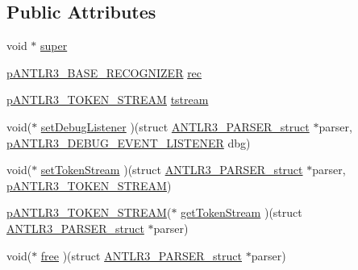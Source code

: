 \subsection*{Public Attributes}
\begin{DoxyCompactItemize}
\item 
void $\ast$ \hyperlink{struct_a_n_t_l_r3___p_a_r_s_e_r__struct_ab6f7f468e985aec5ab97d1a234f5d77b}{super}
\item 
\hyperlink{group___a_n_t_l_r3___b_a_s_e___r_e_c_o_g_n_i_z_e_r_ga5aeeb8dcbf65f45605ae07cbd618e24c}{p\-A\-N\-T\-L\-R3\-\_\-\-B\-A\-S\-E\-\_\-\-R\-E\-C\-O\-G\-N\-I\-Z\-E\-R} \hyperlink{struct_a_n_t_l_r3___p_a_r_s_e_r__struct_a6efb97946c9a31a6c4f6585611055d95}{rec}
\item 
\hyperlink{antlr3interfaces_8h_a9daa2d452cf7fb0c1f4b5e153266070c}{p\-A\-N\-T\-L\-R3\-\_\-\-T\-O\-K\-E\-N\-\_\-\-S\-T\-R\-E\-A\-M} \hyperlink{struct_a_n_t_l_r3___p_a_r_s_e_r__struct_af6bef8139a4d947288cfc416bcde3db4}{tstream}
\item 
void($\ast$ \hyperlink{struct_a_n_t_l_r3___p_a_r_s_e_r__struct_a5f92a481f097af5f5f36097f21c6bf77}{set\-Debug\-Listener} )(struct \hyperlink{struct_a_n_t_l_r3___p_a_r_s_e_r__struct}{A\-N\-T\-L\-R3\-\_\-\-P\-A\-R\-S\-E\-R\-\_\-struct} $\ast$parser, \hyperlink{antlr3interfaces_8h_ab226a624395fcc0b8fe2b29ae60b6116}{p\-A\-N\-T\-L\-R3\-\_\-\-D\-E\-B\-U\-G\-\_\-\-E\-V\-E\-N\-T\-\_\-\-L\-I\-S\-T\-E\-N\-E\-R} dbg)
\item 
void($\ast$ \hyperlink{struct_a_n_t_l_r3___p_a_r_s_e_r__struct_ac0aeae763a29f853540f17c0bc13907a}{set\-Token\-Stream} )(struct \hyperlink{struct_a_n_t_l_r3___p_a_r_s_e_r__struct}{A\-N\-T\-L\-R3\-\_\-\-P\-A\-R\-S\-E\-R\-\_\-struct} $\ast$parser, \hyperlink{antlr3interfaces_8h_a9daa2d452cf7fb0c1f4b5e153266070c}{p\-A\-N\-T\-L\-R3\-\_\-\-T\-O\-K\-E\-N\-\_\-\-S\-T\-R\-E\-A\-M})
\item 
\hyperlink{antlr3interfaces_8h_a9daa2d452cf7fb0c1f4b5e153266070c}{p\-A\-N\-T\-L\-R3\-\_\-\-T\-O\-K\-E\-N\-\_\-\-S\-T\-R\-E\-A\-M}($\ast$ \hyperlink{struct_a_n_t_l_r3___p_a_r_s_e_r__struct_a534c95a165b64e3d53c83de086fbbc4c}{get\-Token\-Stream} )(struct \hyperlink{struct_a_n_t_l_r3___p_a_r_s_e_r__struct}{A\-N\-T\-L\-R3\-\_\-\-P\-A\-R\-S\-E\-R\-\_\-struct} $\ast$parser)
\item 
void($\ast$ \hyperlink{struct_a_n_t_l_r3___p_a_r_s_e_r__struct_ab7b448ec3407ffbf9315c73318d8886f}{free} )(struct \hyperlink{struct_a_n_t_l_r3___p_a_r_s_e_r__struct}{A\-N\-T\-L\-R3\-\_\-\-P\-A\-R\-S\-E\-R\-\_\-struct} $\ast$parser)
\end{DoxyCompactItemize}


